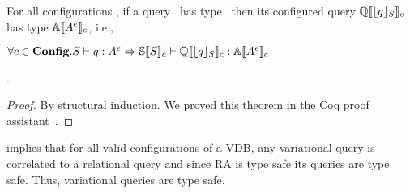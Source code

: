 \begin{theorem}
\label{thm:var-pres}
For all configurations \config, if a query \vQ\ has type \annot \vType\ 
then its configured query \ensuremath{\eeSem {\constrain \vQ}}
has type \ensuremath{\olSem {\annot \vType}}, i.e., \\
\centerline{
\ensuremath{
\forall \config \in \confSet. \envWithoutVctx { \vQ} {\annot \vType} \Rightarrow 
\pEnv [\osSem {\vSch}] {\eeSem {\constrain \vQ}} {\olSem {\annot \vType}}
}}.
\end{theorem}

\begin{proof}
By structural induction. We proved this theorem in the Coq proof assistant~\cite{Khan21}.
\end{proof}


 implies that for all valid configurations of a VDB, any variational
query is correlated to a relational query and since RA is type safe its queries are
type safe. Thus, variational queries are type safe. 

